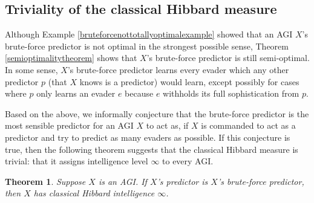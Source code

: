 \documentclass{article}
\newtheorem{theorem}{Theorem}
\begin{document}
\subsection{Triviality of the classical Hibbard measure}
\label{trivialitysubsection}

Although Example \ref{bruteforcenottotallyoptimalexample} showed that
an AGI $X$'s brute-force predictor
is not optimal in the strongest possible sense, Theorem \ref{semioptimalitytheorem}
shows that $X$'s brute-force predictor is still semi-optimal. In some sense,
$X$'s brute-force predictor learns every evader which any other predictor $p$ (that $X$
knows is a predictor) would learn, except possibly for cases where $p$ only learns
an evader $e$ because $e$ withholds its full sophistication from $p$.

Based on the above, we informally conjecture that the brute-force predictor is
the most sensible predictor for an AGI $X$ to act as, if $X$ is commanded to
act as a predictor and try to predict as many evaders as possible. If this conjecture
is true, then the following theorem suggests that the classical Hibbard measure is
trivial: that it assigns intelligence level $\infty$ to every AGI.

\begin{theorem}
    Suppose $X$ is an AGI. If $X$'s predictor is $X$'s brute-force predictor,
    then $X$ has classical Hibbard intelligence $\infty$.
\end{theorem}
\end{document}
